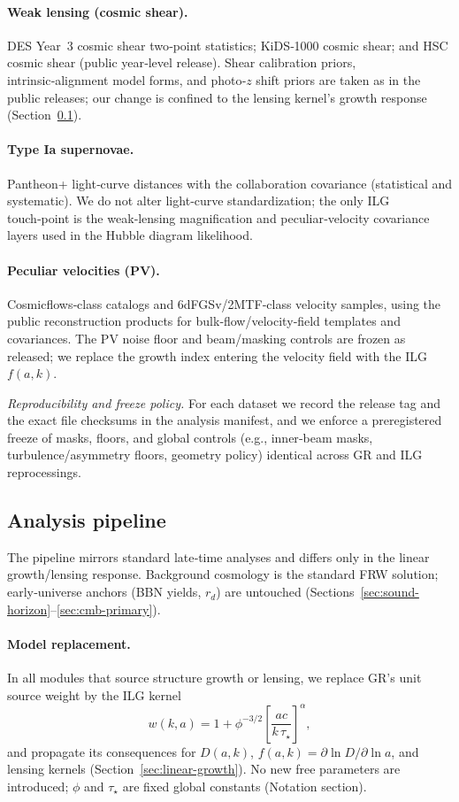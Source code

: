 \documentclass[11pt]{article}
\begin{document}
\paragraph{Weak lensing (cosmic shear).}
DES Year~3 cosmic shear two‑point statistics; KiDS‑1000 cosmic shear; and HSC cosmic shear (public year‑level release). Shear calibration priors, intrinsic‑alignment model forms, and photo‑$z$ shift priors are taken as in the public releases; our change is confined to the lensing kernel’s growth response (Section~\ref{sec:ilg-kernel-inference}).

\paragraph{Type Ia supernovae.}
Pantheon+ light‑curve distances with the collaboration covariance (statistical and systematic). We do not alter light‑curve standardization; the only ILG touch‑point is the weak‑lensing magnification and peculiar‑velocity covariance layers used in the Hubble diagram likelihood.

\paragraph{Peculiar velocities (PV).}
Cosmicflows‑class catalogs and 6dFGSv/2MTF‑class velocity samples, using the public reconstruction products for bulk‑flow/velocity‑field templates and covariances. The PV noise floor and beam/masking controls are frozen as released; we replace the growth index entering the velocity field with the ILG $f(a,k)$.

\medskip
\noindent\emph{Reproducibility and freeze policy.} For each dataset we record the release tag and the exact file checksums in the analysis manifest, and we enforce a preregistered freeze of masks, floors, and global controls (e.g., inner‑beam masks, turbulence/asymmetry floors, geometry policy) identical across GR and ILG reprocessings.

\subsection{Analysis pipeline}\label{sec:ilg-kernel-inference}
The pipeline mirrors standard late‑time analyses and differs only in the linear growth/lensing response. Background cosmology is the standard FRW solution; early‑universe anchors (BBN yields, $r_d$) are untouched (Sections~\ref{sec:sound-horizon}–\ref{sec:cmb-primary}).

\paragraph{Model replacement.}
In all modules that source structure growth or lensing, we replace GR’s unit source weight by the ILG kernel
\[
w(k,a)=1+\phi^{-3/2}\!\left[\frac{a c}{k\,\tau_\star}\right]^\alpha,
\]
and propagate its consequences for $D(a,k)$, $f(a,k)=\partial\ln D/\partial\ln a$, and lensing kernels (Section~\ref{sec:linear-growth}). No new free parameters are introduced; $\phi$ and $\tau_\star$ are fixed global constants (Notation section).
\end{document}
